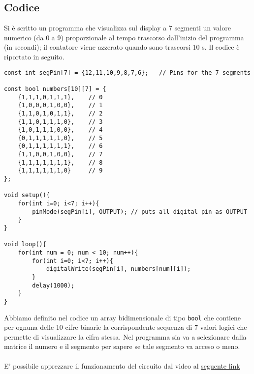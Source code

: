 \subsection{Codice}
Si è scritto un programma che visualizza sul display a 7 segmenti un valore numerico (da 0 a 9) proporzionale al tempo trascorso dall’inizio del programma (in secondi); il contatore viene azzerato quando sono trascorsi 10 s. Il codice è riportato in seguito.
\begin{lstlisting}[frame=single, language=Arduino]
const int segPin[7] = {12,11,10,9,8,7,6};   // Pins for the 7 segments

const bool numbers[10][7] = {
    {1,1,1,0,1,1,1},    // 0
    {1,0,0,0,1,0,0},    // 1
    {1,1,0,1,0,1,1},    // 2
    {1,1,0,1,1,1,0},    // 3
    {1,0,1,1,1,0,0},    // 4
    {0,1,1,1,1,1,0},    // 5
    {0,1,1,1,1,1,1},    // 6
    {1,1,0,0,1,0,0},    // 7
    {1,1,1,1,1,1,1},    // 8
    {1,1,1,1,1,1,0}     // 9
};

void setup(){
    for(int i=0; i<7; i++){
        pinMode(segPin[i], OUTPUT); // puts all digital pin as OUTPUT
    }
}

void loop(){
    for(int num = 0; num < 10; num++){
        for(int i=0; i<7; i++){
            digitalWrite(segPin[i], numbers[num][i]);
        }
        delay(1000);
    }
}
\end{lstlisting}
Abbiamo definito nel codice un array bidimensionale di tipo \texttt{bool} che contiene per ognuna delle 10 cifre binarie la corrispondente sequenza di 7 valori logici che permette di visualizzare la cifra stessa. Nel programma sia va a selezionare dalla matrice il numero e il segmento per sapere se tale segmento va acceso o meno.\\\\
E' possibile apprezzare il funzionamento del circuito dal video al \href{https://mediaspace.unipd.it/media/Esperimento+3/1_pnzjn046}{seguente link}